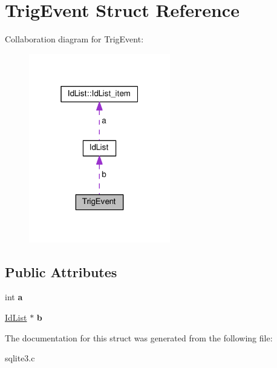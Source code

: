 \hypertarget{structTrigEvent}{}\section{Trig\+Event Struct Reference}
\label{structTrigEvent}


Collaboration diagram for Trig\+Event\+:\nopagebreak
\begin{figure}[H]
\begin{center}
\leavevmode
\includegraphics[width=175pt]{structTrigEvent__coll__graph}
\end{center}
\end{figure}
\subsection*{Public Attributes}
\begin{DoxyCompactItemize}
\item 
int {\bfseries a}\hypertarget{structTrigEvent_a19ac5a5e59e08350f72ec49cf8fccbb6}{}\label{structTrigEvent_a19ac5a5e59e08350f72ec49cf8fccbb6}

\item 
\hyperlink{structIdList}{Id\+List} $\ast$ {\bfseries b}\hypertarget{structTrigEvent_a86ef160cde95382e98b7934614e7f79f}{}\label{structTrigEvent_a86ef160cde95382e98b7934614e7f79f}

\end{DoxyCompactItemize}


The documentation for this struct was generated from the following file\+:\begin{DoxyCompactItemize}
\item 
sqlite3.\+c\end{DoxyCompactItemize}
